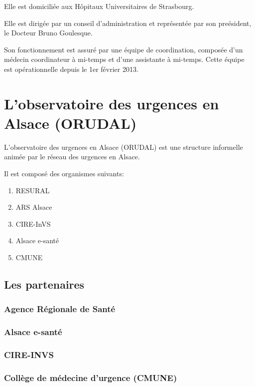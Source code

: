 \documentclass[12pt,english,french,twoside]{report}\usepackage[]{graphicx}\usepackage[]{color}
\begin{document}
Elle est domiciliée aux Hôpitaux Universitaires de Strasbourg.

Elle est dirigée par un conseil d'administration et représentée par son preésident, le Docteur Bruno Goulesque.

Son fonctionnement est assuré par une équipe de coordination, composée d'un médecin coordinateur à mi-temps et d'une assistante à mi-temps. Cette équipe est opérationnelle depuis le 1er février 2013.

\chapter{L'observatoire des urgences en Alsace (ORUDAL)}


L'observatoire des urgences en Alsace (ORUDAL) est une structure informelle animée par le réseau des urgences en Alsace.

Il est composé des organismes suivants:
\begin{enumerate}
  \item RESURAL 
  \item ARS Alsace
  \item CIRE-InVS
  \item Alsace e-santé
  \item CMUNE
\end{enumerate}


\section*{Les partenaires}

  \subsection*{Agence Régionale de Santé}
    
  \subsection*{Alsace e-santé}
    
  \subsection*{CIRE-INVS}
    
  \subsection*{Collège de médecine d'urgence (CMUNE)}
    
\end{document}
